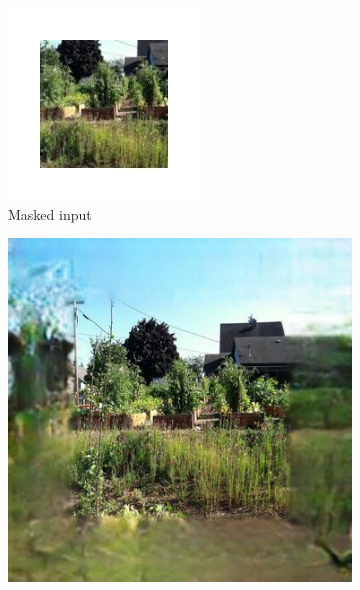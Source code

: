 \documentclass{article}
\begin{document}
\begin{figure}
	\captionsetup[subfigure]{labelformat=empty}
    \centering
    \begin{subfigure}[b]{0.175\textwidth}
        \includegraphics[width=\textwidth]{figs/fig2/masked_input}
        \caption{Masked input}
    \end{subfigure}
    \hfill
    \begin{subfigure}[b]{0.175\textwidth}
        \includegraphics[width=\textwidth]{figs/fig2/baseline}

\end{subfigure}
\end{figure}
\end{document}
